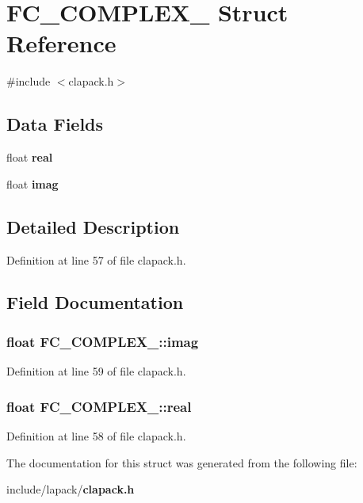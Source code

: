 \section{F\-C\-\_\-\-C\-O\-M\-P\-L\-E\-X\-\_ Struct Reference}
\label{d4/d56/structFC__COMPLEX__08}


{\ttfamily \#include $<$clapack.\-h$>$}

\subsection*{Data Fields}
\begin{DoxyCompactItemize}
\item 
float {\bf real}
\item 
float {\bf imag}
\end{DoxyCompactItemize}


\subsection{Detailed Description}


Definition at line 57 of file clapack.\-h.



\subsection{Field Documentation}
\subsubsection[{imag}]{\setlength{\rightskip}{0pt plus 5cm}float F\-C\-\_\-\-C\-O\-M\-P\-L\-E\-X\-\_\-::imag}\label{d4/d56/structFC__COMPLEX__08_abf5fdfd13f39d9fc9b055d7a83415512}


Definition at line 59 of file clapack.\-h.

\subsubsection[{real}]{\setlength{\rightskip}{0pt plus 5cm}float F\-C\-\_\-\-C\-O\-M\-P\-L\-E\-X\-\_\-::real}\label{d4/d56/structFC__COMPLEX__08_a4054ea8dd468d4c10370d337e578c16a}


Definition at line 58 of file clapack.\-h.



The documentation for this struct was generated from the following file\-:\begin{DoxyCompactItemize}
\item 
include/lapack/{\bf clapack.\-h}\end{DoxyCompactItemize}
